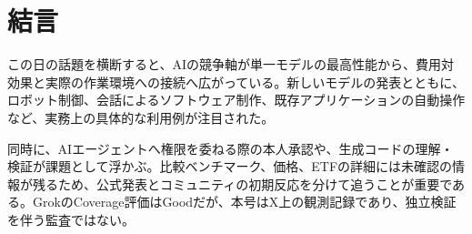 \section{結言}
この日の話題を横断すると、AIの競争軸が単一モデルの最高性能から、費用対効果と実際の作業環境への接続へ広がっている。新しいモデルの発表とともに、ロボット制御、会話によるソフトウェア制作、既存アプリケーションの自動操作など、実務上の具体的な利用例が注目された。

同時に、AIエージェントへ権限を委ねる際の本人承認や、生成コードの理解・検証が課題として浮かぶ。比較ベンチマーク、価格、ETFの詳細には未確認の情報が残るため、公式発表とコミュニティの初期反応を分けて追うことが重要である。GrokのCoverage評価はGoodだが、本号はX上の観測記録であり、独立検証を伴う監査ではない。